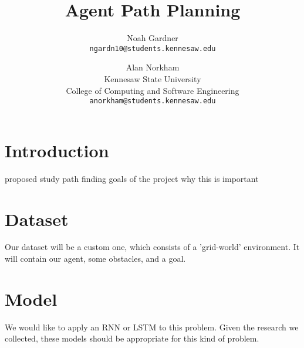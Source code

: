 \documentclass[11pt,a4paper]{article}
\title{Agent Path Planning}
\author{Noah Gardner \\
    \texttt{ngardn10@students.kennesaw.edu} \\}
\author{Alan Norkham \\
  Kennesaw State University \\
  College of Computing and Software Engineering \\
  \texttt{anorkham@students.kennesaw.edu} \\}
\begin{document}
\maketitle
\begin{abstract}

\end{abstract}

\section{Introduction}
proposed study
path finding
goals of the project
why this is important

\section{Dataset}
Our dataset will be a custom one, which consists of a 'grid-world' environment.
It will contain our agent, some obstacles, and a goal.

\section{Model}
We would like to apply an RNN or LSTM to this problem. Given the research we
collected, these models should be appropriate for this kind of problem.
\end{document}
